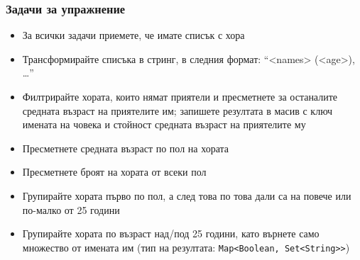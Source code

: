 \documentclass[ignorenonframetext, hyperref=unicode,compress,pdflatex]{beamer}
\begin{document}
\begin{frame}[containsverbatim]\frametitle{Задачи за упражнение}
\begin{itemize}
  \item За всички задачи приемете, че имате списък с хора
  \item Трансформирайте списъка в стринг, в следния формат: ``<names> (<age>),
  \ldots''
  \item Филтрирайте хората, които нямат приятели и пресметнете за останалите
  средната възраст на приятелите им; запишете резултата в масив с ключ имената
  на човека и стойност средната възраст на приятелите му
  \item Пресметнете средната възраст по пол на хората
  \item Пресметнете броят на хората от всеки пол
  \item Групирайте хората първо по пол, а след това по това дали са на повече
  или по-малко от 25 години
  \item Групирайте хората по възраст над/под 25 години, като върнете
  само множество от имената им (тип на резултата:
  \lstinline{Map<Boolean, Set<String>>})
\end{itemize}
\end{frame}
\end{document}
